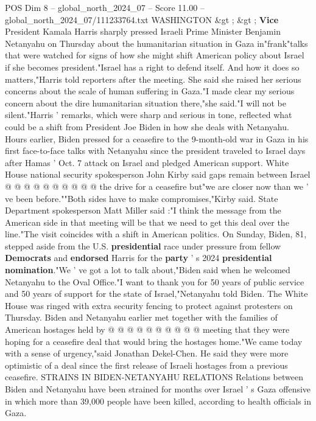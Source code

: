 \begin{textsample}{POS Dim 8 – global\_north\_2024\_07 – Score 11.00 – global\_north\_2024\_07/111233764.txt}  \label{ex:f8_pos_048}
WASHINGTON \&gt ; \&gt ; \textbf{Vice} President Kamala Harris sharply pressed Israeli Prime Minister Benjamin Netanyahu on Thursday about the humanitarian situation in Gaza in"frank"talks that were watched for signs of how she might shift American policy about Israel if she becomes president."Israel has a right to defend itself.
And how it does so matters,"Harris told reporters after the meeting.
She said she raised her serious concerns about the scale of human suffering in Gaza."I made clear my serious concern about the dire humanitarian situation there,"she said."I will not be silent."Harris ' remarks, which were sharp and serious in tone, reflected what could be a shift from President Joe Biden in how she deals with Netanyahu.
Hours earlier, Biden pressed for a ceasefire to the 9-month-old war in Gaza in his first face-to-face talks with Netanyahu since the president traveled to Israel days after Hamas ' Oct. 7 attack on Israel and pledged American support.
White House national security spokesperson John Kirby said gaps remain between Israel @ @ @ @ @ @ @ @ @ @ the drive for a ceasefire but"we are closer now than we ' ve been before.""Both sides have to make compromises,"Kirby said.
State Department spokesperson Matt Miller said :"I think the message from the American side in that meeting will be that we need to get this deal over the line."The visit coincides with a shift in American politics.
On Sunday, Biden, 81, stepped aside from the U.S. \textbf{presidential} race under pressure from fellow \textbf{Democrats} and \textbf{endorsed} Harris for the \textbf{party} ' s 2024 \textbf{presidential} \textbf{nomination}."We ' ve got a lot to talk about,"Biden said when he welcomed Netanyahu to the Oval Office."I want to thank you for 50 years of public service and 50 years of support for the state of Israel,"Netanyahu told Biden.
The White House was ringed with extra security fencing to protect against protesters on Thursday.
Biden and Netanyahu earlier met together with the families of American hostages held by @ @ @ @ @ @ @ @ @ @ meeting that they were hoping for a ceasefire deal that would bring the hostages home."We came today with a sense of urgency,"said Jonathan Dekel-Chen.
He said they were more optimistic of a deal since the first release of Israeli hostages from a previous ceasefire.
STRAINS IN BIDEN-NETANYAHU RELATIONS Relations between Biden and Netanyahu have been strained for months over Israel ' s Gaza offensive in which more than 39,000 people have been killed, according to health officials in Gaza.

\end{textsample}
